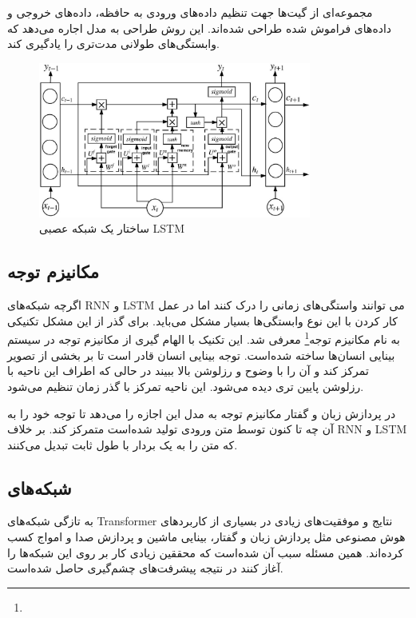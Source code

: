 \documentclass[12pt, a4paper, oneside]{report}
\begin{document}
مجموعه‌ای از گیت‌ها جهت تنظیم داده‌های ورودی به حافظه، داده‌های خروجی و داده‌های فراموش شده طراحی
شده‌اند. این روش طراحی به مدل اجاره می‌دهد که وابستگی‌های طولانی مدت‌تری را یادگیری کند\cite{8844895}.

\begin{figure}[!ht]
    \centering
    \includegraphics[width=0.8\textwidth]{lstm}
    \caption{ساختار یک شبکه عصبی LSTM}
    \label{fig:lstm}
\end{figure}

\subsection{مکانیزم توجه}

اگرچه شبکه‌های
RNN
و
LSTM
می توانند واستگی‌های زمانی را درک کنند اما در عمل کار کردن با این نوع وابستگی‌ها بسیار مشکل می‌باید. برای گذر از این
مشکل تکنیکی به نام
مکانیزم توجه\footnote{}
معرفی شد. این تکنیک با الهام گیری از مکانیزم توجه در سیستم بینایی انسان‌ها ساخته شده‌است. توجه بینایی انسان قادر است
تا بر بخشی از تصویر تمرکز کند و آن را با وضوح و رزلوشن بالا ببیند در حالی که اطراف این ناحیه با رزلوشن پایین تری دیده می‌شود.
این ناحیه تمرکز با گذر زمان تنظیم می‌شود.

در پردازش زبان و گفتار مکانیزم توجه به مدل این اجازه را می‌دهد تا توجه خود را به آن چه تا کنون توسط متن ورودی تولید شده‌است
متمرکز کند. بر خلاف
RNN
و
LSTM
که متن را به یک بردار با طول ثابت تبدیل می‌کنند.

\subsection{شبکه‌های }
به تازگی شبکه‌های
Transformer
نتایج و موفقیت‌های زیادی در بسیاری از کاربرد‌های هوش مصنوعی مثل پردازش زبان و گفتار، بینایی ماشین و
پردازش صدا و امواج کسب کرده‌اند. همین مسئله سبب آن شده‌است که محققین زیادی کار بر روی این شبکه‌ها را آغاز کنند
در نتیجه پیشرفت‌های چشم‌گیری حاصل شده‌است.
\end{document}

